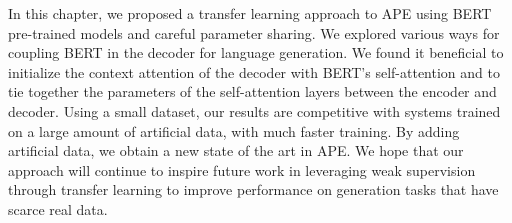 In this chapter, we proposed a transfer learning approach to APE
using BERT pre-trained models and careful parameter sharing. We
explored various ways for coupling BERT in the decoder for language
generation. We found it beneficial to initialize the context
attention of the decoder with BERT's self-attention and to tie
together the parameters of the self-attention layers between the
encoder and decoder. Using a small dataset, our results are
competitive with systems trained on a large amount of artificial
data, with much faster training. By adding artificial data, we obtain
a new state of the art in APE. We hope that our approach will
continue to inspire future work in leveraging weak supervision
through transfer learning to improve performance on generation tasks
that have scarce real data.

\cleardoublepage
